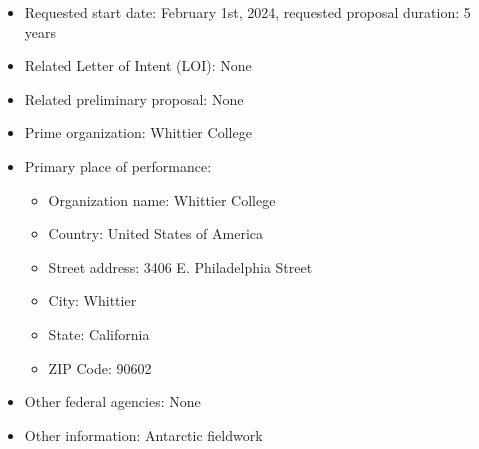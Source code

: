 \documentclass[../../main.tex]{subfiles}
\begin{document}
\begin{itemize}
\item Requested start date: February 1st, 2024, requested proposal duration: 5 years
\item Related Letter of Intent (LOI): None
\item Related preliminary proposal: None
\item Prime organization: Whittier College
\item Primary place of performance:
\begin{itemize}
\item Organization name: Whittier College
\item Country: United States of America
\item Street address: 3406 E. Philadelphia Street
\item City: Whittier
\item State: California
\item ZIP Code: 90602
\end{itemize}
\item Other federal agencies: None
\item Other information: Antarctic fieldwork
\end{itemize}

\clearpage
\end{document}
